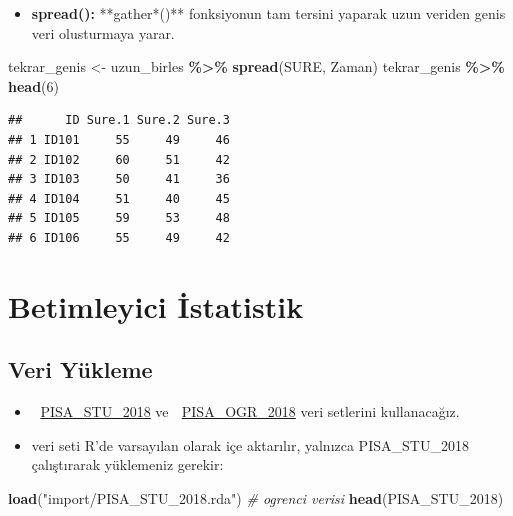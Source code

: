 \documentclass[
  oneside]{book}
\newenvironment{Shaded}{\begin{snugshade}}{\end{snugshade}}
\newcommand{\CommentTok}[1]{\textcolor[rgb]{0.56,0.35,0.01}{\textit{#1}}}
\newcommand{\DecValTok}[1]{\textcolor[rgb]{0.00,0.00,0.81}{#1}}
\newcommand{\FunctionTok}[1]{\textcolor[rgb]{0.13,0.29,0.53}{\textbf{#1}}}
\newcommand{\NormalTok}[1]{#1}
\newcommand{\OtherTok}[1]{\textcolor[rgb]{0.56,0.35,0.01}{#1}}
\newcommand{\SpecialCharTok}[1]{\textcolor[rgb]{0.81,0.36,0.00}{\textbf{#1}}}
\newcommand{\StringTok}[1]{\textcolor[rgb]{0.31,0.60,0.02}{#1}}
\providecommand{\tightlist}{%
  \setlength{\itemsep}{0pt}\setlength{\parskip}{0pt}}
\begin{document}
\begin{itemize}
\tightlist
\item
  \textbf{spread():} **gather*()** fonksiyonun tam tersini yaparak uzun veriden genis veri olusturmaya yarar.
\end{itemize}

\begin{Shaded}
\begin{Highlighting}[]
\NormalTok{tekrar\_genis }\OtherTok{\textless{}{-}}\NormalTok{ uzun\_birles }\SpecialCharTok{\%\textgreater{}\%} \FunctionTok{spread}\NormalTok{(SURE, Zaman)}
\NormalTok{tekrar\_genis }\SpecialCharTok{\%\textgreater{}\%} \FunctionTok{head}\NormalTok{(}\DecValTok{6}\NormalTok{)}
\end{Highlighting}
\end{Shaded}

\begin{verbatim}
##      ID Sure.1 Sure.2 Sure.3
## 1 ID101     55     49     46
## 2 ID102     60     51     42
## 3 ID103     50     41     36
## 4 ID104     51     40     45
## 5 ID105     59     53     48
## 6 ID106     55     49     42
\end{verbatim}

\hypertarget{betimleyici-istatistik}{%
\chapter{Betimleyici İstatistik}\label{betimleyici-istatistik}}

\hypertarget{veri-yuxfckleme}{%
\section{Veri Yükleme}\label{veri-yuxfckleme}}

\begin{itemize}
\item
  🔗 \href{import/PISA_STU_2018.rda}{PISA\_STU\_2018} ve 🔗 \href{(import/PISA_OGR_2018.rda)}{PISA\_OGR\_2018} veri setlerini kullanacağız.
\item
  veri seti R'de varsayılan olarak içe aktarılır, yalnızca PISA\_STU\_2018 çalıştırarak yüklemeniz gerekir:
\end{itemize}

\begin{Shaded}
\begin{Highlighting}[]
\FunctionTok{load}\NormalTok{(}\StringTok{"import/PISA\_STU\_2018.rda"}\NormalTok{) }\CommentTok{\# ogrenci verisi}
\FunctionTok{head}\NormalTok{(PISA\_STU\_2018)}
\end{Highlighting}
\end{Shaded}
\end{document}
